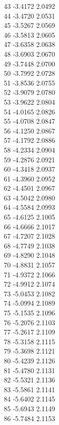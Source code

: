 \documentclass[11pt]{article}
\theoremstyle{definition}
\theoremstyle{plain}
\begin{document}
{43 -3.4172 2.0492\\
44 -3.4720 2.0531\\
45 -3.5267 2.0569\\
46 -3.5813 2.0605\\
47 -3.6358 2.0638\\
48 -3.6903 2.0670\\
49 -3.7448 2.0700\\
50 -3.7992 2.0728\\
51 -3.8536 2.0755\\
52 -3.9079 2.0780\\
53 -3.9622 2.0804\\
54 -4.0165 2.0826\\
55 -4.0708 2.0847\\
56 -4.1250 2.0867\\
57 -4.1792 2.0886\\
58 -4.2334 2.0904\\
59 -4.2876 2.0921\\
60 -4.3418 2.0937\\
61 -4.3960 2.0952\\
62 -4.4501 2.0967\\
63 -4.5042 2.0980\\
64 -4.5584 2.0993\\
65 -4.6125 2.1005\\
66 -4.6666 2.1017\\
67 -4.7207 2.1028\\
68 -4.7749 2.1038\\
69 -4.8290 2.1048\\
70 -4.8831 2.1057\\
71 -4.9372 2.1066\\
72 -4.9912 2.1074\\
73 -5.0453 2.1082\\
74 -5.0994 2.1089\\
75 -5.1535 2.1096\\
76 -5.2076 2.1103\\
77 -5.2617 2.1109\\
78 -5.3158 2.1115\\
79 -5.3698 2.1121\\
80 -5.4239 2.1126\\
81 -5.4780 2.1131\\
82 -5.5321 2.1136\\
83 -5.5861 2.1141\\
84 -5.6402 2.1145\\
85 -5.6943 2.1149\\
86 -5.7484 2.1153\\
}
\end{document}
